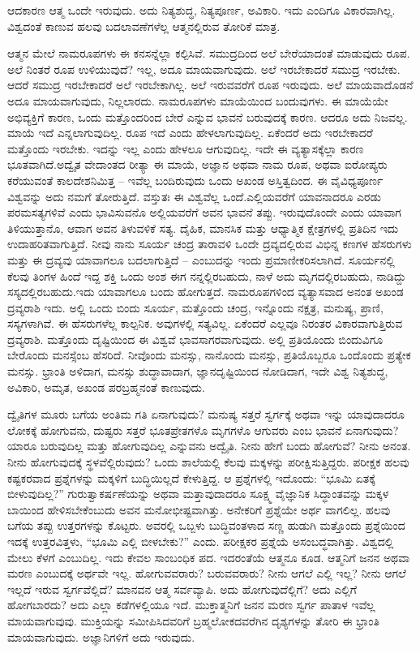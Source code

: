 ಆದಕಾರಣ ಆತ್ಮ ಒಂದೇ ಇರುವುದು. ಅದು ನಿತ್ಯಶುದ್ಧ, ನಿತ್ಯಪೂರ್ಣ, ಅವಿಕಾರಿ. ಇದು ಎಂದಿಗೂ ವಿಕಾರವಾಗಿಲ್ಲ. ವಿಶ್ವದಂತೆ ಕಾಣುವ ಹಲವು ಬದಲಾವಣೆಗಳೆಲ್ಲ ಆತ್ಮನಲ್ಲಿರುವ ತೋರಿಕೆ ಮಾತ್ರ.

ಆತ್ಮನ ಮೇಲೆ ನಾಮರೂಪಗಳು ಈ ಕನಸನ್ನೆಲ್ಲಾ ಕಲ್ಪಿಸಿವೆ. ಸಮುದ್ರದಿಂದ ಅಲೆ ಬೇರೆಯಾದಂತೆ ಮಾಡುವುದು ರೂಪ. ಅಲೆ ನಿಂತರೆ ರೂಪ ಉಳಿಯುವುದೆ? ಇಲ್ಲ, ಅದೂ ಮಾಯವಾಗುವುದು. ಅಲೆ ಇರಬೇಕಾದರೆ ಸಮುದ್ರ ಇರಬೇಕು. ಆದರೆ ಸಮುದ್ರ ಇರಬೇಕಾದರೆ ಅಲೆ ಇರಬೇಕಾಗಿಲ್ಲ. ಅಲೆ ಇರುವವರೆಗೆ ರೂಪ ಇರುವುದು. ಅಲೆ ಮಾಯವಾದೊಡನೆ ಅದೂ ಮಾಯವಾಗುವುದು, ನಿಲ್ಲಲಾರದು. ನಾಮರೂಪಗಳು ಮಾಯೆಯಿಂದ ಬಂದುವುಗಳು. ಈ ಮಾಯೆಯೇ ಅಭಿವ್ಯಕ್ತಿಗೆ ಕಾರಣ, ಒಂದು ಮತ್ತೊಂದರಿಂದ ಬೇರೆ ಎನ್ನುವ ಭಾವನೆ ಬರುವುದಕ್ಕೆ ಕಾರಣ. ಆದರೂ ಅದು ನಿಜವಲ್ಲ. ಮಾಯೆ ಇದೆ ಎನ್ನಲಾಗುವುದಿಲ್ಲ. ರೂಪ ಇದೆ ಎಂದು ಹೇಳಲಾಗುವುದಿಲ್ಲ. ಏಕೆಂದರೆ ಅದು ಇರಬೇಕಾದರೆ ಮತ್ತೊಂದು ಇರಬೇಕು. ಇದನ್ನು ಇಲ್ಲ ಎಂದು ಹೇಳಲೂ ಆಗುವುದಿಲ್ಲ. ಇದೇ ಈ ವ್ಯತ್ಯಾಸಕ್ಕೆಲ್ಲಾ ಕಾರಣ ಭೂತವಾಗಿದೆ.ಅದ್ವೈತ ವೇದಾಂತದ ರೀತ್ಯಾ ಈ ಮಾಯೆ, ಅಜ್ಞಾನ ಅಥವಾ ನಾಮ ರೂಪ, ಅಥವಾ ಐರೋಪ್ಯರು ಕರೆಯುವಂತೆ ಕಾಲದೇಶನಿಮಿತ್ತ – ಇವೆಲ್ಲ ಬಂದಿರುವುದು ಒಂದು ಅಖಂಡ ಅಸ್ತಿತ್ವದಿಂದ. ಈ ವೈವಿಧ್ಯಪೂರ್ಣ ವಿಶ್ವವನ್ನು ಅದು ನಮಗೆ ತೋರುತ್ತಿದೆ. ವಸ್ತುತಃ ಈ ವಿಶ್ವವೆಲ್ಲ ಒಂದೆ.ಎಲ್ಲಿಯವರೆಗೆ ಯಾವನಾದರೂ ಎರಡು ಪರಮಸತ್ಯಗಳಿವೆ ಎಂದು ಭಾವಿಸುವನೊ ಅಲ್ಲಿಯವರೆಗೆ ಅವನ ಭಾವನೆ ತಪ್ಪು. ಇರುವುದೊಂದೇ ಎಂದು ಯಾವಾಗ ತಿಳಿಯುತ್ತಾನೊ, ಆವಾಗ ಅವನ ತಿಳುವಳಿಕೆ ಸತ್ಯ. ದೈಹಿಕ, ಮಾನಸಿಕ ಮತ್ತು ಆಧ್ಯಾತ್ಮಿಕ ಕ್ಷೇತ್ರಗಳಲ್ಲಿ ಪ್ರತಿದಿನ ಇದು ಉದಾಹರಿತವಾಗುತ್ತಿದೆ. ನೀವು ನಾನು ಸೂರ್ಯ ಚಂದ್ರ ತಾರಾವಳಿ ಒಂದೇ ದ್ರವ್ಯದಲ್ಲಿರುವ ವಿಭಿನ್ನ ಕಣಗಳ ಹೆಸರುಗಳು ಮತ್ತು ಈ ದ್ರವ್ಯವು ಯಾವಾಗಲೂ ಬದಲಾಗುತ್ತಿದೆ – ಎಂಬುದನ್ನು ಇಂದು ಪ್ರಮಾಣೀಕರಿಸಲಾಗಿದೆ. ಸೂರ್ಯನಲ್ಲಿ ಕೆಲವು ತಿಂಗಳ ಹಿಂದೆ ಇದ್ದ ಶಕ್ತಿ ಒಂದು ಅಂಶ ಈಗ ನನ್ನಲ್ಲಿರಬಹುದು, ನಾಳೆ ಅದು ಮೃಗದಲ್ಲಿರಬಹುದು, ನಾಡಿದ್ದು ಸಸ್ಯದಲ್ಲಿರಬಹುದು.ಇದು ಯಾವಾಗಲೂ ಬಂದು ಹೋಗುತ್ತದೆ. ನಾಮರೂಪಗಳಿಂದ ವ್ಯತ್ಯಾಸವಾದ ಅನಂತ ಅಖಂಡ ದ್ರವ್ಯರಾಶಿ ಇದು. ಅಲ್ಲಿ ಒಂದು ಬಿಂದು ಸೂರ್ಯ, ಮತ್ತೊಂದು ಚಂದ್ರ, ಇನ್ನೊಂದು ನಕ್ಷತ್ರ, ಮನುಷ್ಯ, ಪ್ರಾಣಿ, ಸಸ್ಯಗಳಾಗಿವೆ. ಈ ಹೆಸರುಗಳೆಲ್ಲ ಕಾಲ್ಪನಿಕ. ಅವುಗಳಲ್ಲಿ ಸತ್ಯವಿಲ್ಲ. ಏಕೆಂದರೆ ಎಲ್ಲವೂ ನಿರಂತರ ವಿಕಾರವಾಗುತ್ತಿರುವ ದ್ರವ್ಯರಾಶಿ. ಮತ್ತೊಂದು ದೃಷ್ಟಿಯಿಂದ ಈ ವಿಶ್ವವೆ ಭಾವಸಾಗರವಾಗುವುದು. ಅಲ್ಲಿ ಪ್ರತಿಯೊಂದು ಬಿಂದುವಿಗೂ ಬೇರೊಂದು ಮನಸ್ಸೆಂಬ ಹೆಸರಿದೆ. ನೀವೊಂದು ಮನಸ್ಸು, ನಾನೊಂದು ಮನಸ್ಸು, ಪ್ರತಿಯೊಬ್ಬರೂ ಒಂದೊಂದು ಪ್ರತ್ಯೇಕ ಮನಸ್ಸು. ಭ್ರಾಂತಿ ಅಳಿದಾಗ, ಮನಸ್ಸು ಶುದ್ಧಾವಾದಾಗ, ಜ್ಞಾನದೃಷ್ಟಿಯಿಂದ ನೋಡಿದಾಗ, ಇದೇ ವಿಶ್ವ ನಿತ್ಯಶುದ್ಧ, ಅವಿಕಾರಿ, ಅಮೃತ, ಅಖಂಡ ಪರಬ್ರಹ್ಮನಂತೆ ಕಾಣುವುದು.

ದ್ವೈತಿಗಳ ಮೂರು ಬಗೆಯ ಅಂತಿಮ ಗತಿ ಏನಾಗುವುದು? ಮನುಷ್ಯ ಸತ್ತರೆ ಸ್ವರ್ಗಕ್ಕೆ ಅಥವಾ ಇನ್ನು ಯಾವುದಾದರೂ ಲೋಕಕ್ಕೆ ಹೋಗುವನು, ದುಷ್ಟರು ಸತ್ತರೆ ಭೂತಪ್ರೇತಗಳೊ ಮೃಗಗಳೊ ಆಗುವರು ಎಂಬ ಭಾವನೆ ಏನಾಗುವುದು? ಯಾರೂ ಬರುವುದಿಲ್ಲ ಮತ್ತು ಹೋಗುವುದಿಲ್ಲ ಎನ್ನುವನು ಅದ್ವೈತಿ. ನೀನು ಹೇಗೆ ಬಂದು ಹೋಗುವೆ? ನೀನು ಅನಂತ. ನೀನು ಹೋಗುವುದಕ್ಕೆ ಸ್ಥಳವೆಲ್ಲಿರುವುದು? ಒಂದು ಶಾಲೆಯಲ್ಲಿ ಕೆಲವು ಮಕ್ಕಳನ್ನು ಪರೀಕ್ಷಿಸುತ್ತಿದ್ದರು. ಪರೀಕ್ಷಕ ಹಲವು ಕಷ್ಟಕರವಾದ ಪ್ರಶ್ನೆಗಳನ್ನು ಮಕ್ಕಳಿಗೆ ಬುದ್ಧಿಯಿಲ್ಲದೆ ಕೇಳುತ್ತಿದ್ದ. ಆ ಪ್ರಶ್ನೆಗಳಲ್ಲಿ ಇದೊಂದು: “ಭೂಮಿ ಏತಕ್ಕೆ ಬೀಳುವುದಿಲ್ಲ?” ಗುರುತ್ವಾಕರ್ಷಣೆಯನ್ನು ಅಥವಾ ಮತ್ತಾವುದಾದರೂ ಸೂಕ್ಷ್ಮ ವೈಜ್ಞಾನಿಕ ಸಿದ್ಧಾಂತವನ್ನು ಮಕ್ಕಳ ಬಾಯಿಂದ ಹೇಳಿಸಬೇಕೆಂಬುದು ಅವನ ಮನೋಭೀಷ್ಟವಾಗಿತ್ತು. ಅನೇಕರಿಗೆ ಪ್ರಶ್ನೆಯೇ ಅರ್ಥ ವಾಗಲಿಲ್ಲ. ಹಲವು ಬಗೆಯ ತಪ್ಪು ಉತ್ತರಗಳನ್ನು ಕೊಟ್ಟರು. ಅವರಲ್ಲಿ ಒಬ್ಬಳು ಬುದ್ಧಿವಂತಳಾದ ಸಣ್ಣ ಹುಡುಗಿ ಮತ್ತೊಂದು ಪ್ರಶ್ನೆಯಿಂದ ಇದಕ್ಕೆ ಉತ್ತರವಿತ್ತಳು, “ಭೂಮಿ ಎಲ್ಲಿ ಬೀಳಬೇಕು?” ಎಂದು. ಪರೀಕ್ಷಕರ ಪ್ರಶ್ನೆಯೆ ಅಸಂಬದ್ಧವಾಗಿತ್ತು. ವಿಶ್ವದಲ್ಲಿ ಮೇಲು ಕೆಳಗೆ ಎಂಬುದಿಲ್ಲ. ಇದು ಕೇವಲ ಸಾಂಬಂಧಿಕ ಪದ. ಇದರಂತೆಯೆ ಆತ್ಮನೂ ಕೂಡ. ಆತ್ಮನಿಗೆ ಜನನ ಅಥವಾ ಮರಣ ಎಂಬುದಕ್ಕೆ ಅರ್ಥವೇ ಇಲ್ಲ. ಹೋಗುವವರಾರು? ಬರುವವರಾರು? ನೀನು ಆಗಲೆ ಎಲ್ಲಿ ಇಲ್ಲ? ನೀನು ಆಗಲೆ ಇಲ್ಲದೆ ಇರುವ ಸ್ವರ್ಗವೆಲ್ಲಿದೆ? ಮಾನವನ ಆತ್ಮ ಸರ್ವವ್ಯಾಪಿ. ಅದು ಹೋಗುವುದೆಲ್ಲಿಗೆ? ಅದು ಎಲ್ಲಿಗೆ ಹೋಗಬಾರದು? ಅದು ಎಲ್ಲಾ ಕಡೆಗಳಲ್ಲಿಯೂ ಇದೆ. ಮುಕ್ತಾತ್ಮನಿಗೆ ಜನನ ಮರಣ ಸ್ವರ್ಗ ಪಾತಾಳ ಇವೆಲ್ಲ ಮಾಯವಾಗುವುವು. ಮುಕ್ತಿಯನ್ನು ಸಮೀಪಿಸಿದವರಿಗೆ ಬ್ರಹ್ಮಲೋಕದವರೆಗಿನ ದೃಶ್ಯಗಳನ್ನು ತೋರಿ ಈ ಭ್ರಾಂತಿ ಮಾಯವಾಗುವುದು. ಅಜ್ಞಾನಿಗಳಿಗೆ ಅದು ಇರುವುದು.

